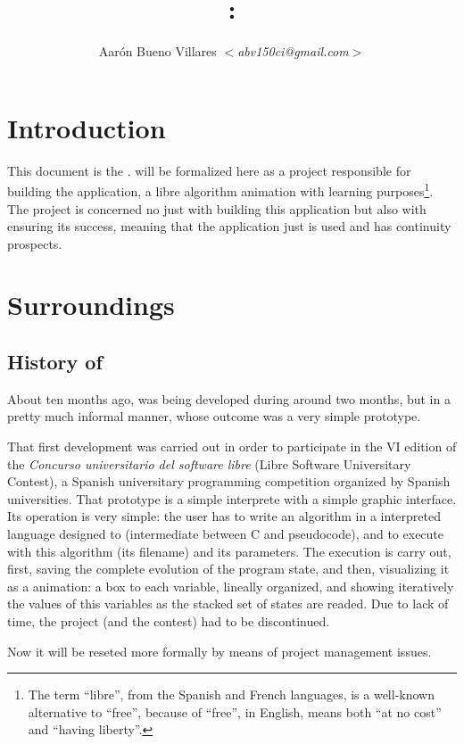 \documentclass[twocolumn]{article}
\title{\fav: \favc}
\author{Aarón Bueno Villares \textit{$<$abv150ci@gmail.com$>$}}
\begin{document}
\twocolumn[
  \maketitle
]

\tableofcontents

\section{Introduction}
This document is the \favc. \favp will be formalized
here as a project responsible for building the \fav application, a
libre algorithm animation with learning purposes\footnote{The
  term ``libre'', from the Spanish and French languages, is a well-known
  alternative to ``free'', because of ``free'', in English, means both
  ``at no cost'' and ``having liberty''.}. The
project is concerned no just with building this
application but also with ensuring its success, meaning that the
application just is used and has continuity prospects.

\section{Surroundings}
\subsection{History of \fav}
\label{subsec:history}
About ten months ago, \fav was
being developed during around two months, but in a pretty much
informal manner, whose outcome was a very simple prototype.

That first \fav development was carried out in order to participate in the
VI edition of the \textit{Concurso universitario del software libre}
(Libre Software Universitary Contest), a Spanish
universitary programming competition organized by Spanish
universities. That prototype is a simple interprete with a simple
graphic interface. Its operation is very simple: the user has to write
an algorithm in a interpreted language designed to \fav (intermediate
between C and pseudocode), and to execute \fav with this algorithm
(its filename) and its parameters. The execution is carry out, first,
saving the complete evolution of the program state, and then,
visualizing it as a animation: a box to each variable, lineally
organized, and showing iteratively the values of this variables as the
stacked set of states are readed. Due to lack of time, the
project (and the contest) had to be discontinued.

Now it will be reseted more formally by means of project
management issues.
\end{document}

